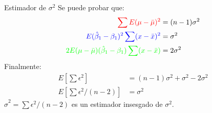 \begin{frame}{Estimador de $\sigma^{2}$}
	Se puede probar que:
	\begin{align*}
		\textcolor{red}{\sum E (\mu-\bar\mu)^2} & = (n-1)\sigma^2 \\
		\textcolor{blue}{E(\hat\beta_1 -\beta_1)^2\sum(x-\bar x)^2} & = \sigma^2 \\
		\textcolor{green}{2 E(\mu-\bar\mu)(\hat\beta_1 -\beta_1)\sum(x-\bar x)} & =  2\sigma^2 
	\end{align*}
	Finalmente:
	\begin{align*}
		E\left[\sum\epsilon^2\right] &= (n-1)\sigma^2 +  \sigma^2 -2\sigma^2  \\
		E\left[\sum\epsilon^2/(n-2) \right] &= \sigma^2 
	\end{align*}
	$\hat\sigma^2=\sum\epsilon^2/(n-2)$ es un estimador insesgado de $\sigma^2$.
\end{frame}
